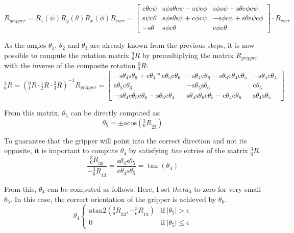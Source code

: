 \documentclass[twoside]{article}
\renewcommand{\c}{\text{c}}
\newcommand{\s}{\text{s}}
\newcommand{\R}[2]{\mbox{$_{#2}^{#1}{R}$}}
\newcommand{\acos}{\text{acos}}
\begin{document}
\begin{equation}
  R_{gripper} = R_z(\psi) R_y(\theta) R_x(\phi) R_{corr}
=
  \begin{bmatrix}
    \c\theta \c\psi& \s\phi \s\theta \c\psi - \s\psi \c\phi&  \s\phi \s\psi + \s\theta \c\phi \c\psi \\
    \s\psi \c\theta& \s\phi \s\theta \s\psi + \c\phi \c\psi& -\s\phi \c\psi + \s\theta \s\psi \c\phi \\
          -\s\theta&                        \s\phi \c\theta&                         \c\phi \c\theta
  \end{bmatrix}
  \cdot R_{corr}
\end{equation}

As the angles $\theta_1$, $\theta_2$ and $\theta_3$ are already known from the previous steps,
it is now possible to compute the rotation matrix $\R{3}{6}$ by premultiplying the matrix $R_{gripper}$
with the inverse of the composite rotation $\R{0}{3}$:
\begin{equation}
  \R{3}{6} = (\R{0}{1}\cdot \R{1}{2}\cdot \R{2}{3})^{-1} R_{gripper} =
  \begin{bmatrix}
    -\s\theta_4 \s\theta_6 + \c\theta_4*\c\theta_5 \c\theta_6 & -\s\theta_4 \c\theta_6 - \s\theta_6 \c\theta_4 \c\theta_5 & -\s\theta_5 \c\theta_4 \\
                                        \s\theta_5 \c\theta_6 &                                    -\s\theta_5 \s\theta_6 &             \c\theta_5 \\
    -\s\theta_4 \c\theta_5 \c\theta_6 - \s\theta_6 \c\theta_4 &  \s\theta_4 \s\theta_6 \c\theta_5 - \c\theta_4 \c\theta_6 &  \s\theta_4 \s\theta_5
  \end{bmatrix}
\end{equation}

From this matrix, $\theta_5$ can be directly computed as:
\begin{equation}
  \theta_5 = \pm\acos(\R{3}{6}_{23})
\end{equation}

To guarantee that the gripper will point into the correct direction and not its opposite,
it is important to compute $\theta_4$  by satisfying \emph{two} entries of the matrix
$\R{3}{6}$.
\begin{equation}
  \frac{\R{3}{6}_{33}}{-\R{3}{6}_{13}} = \frac{\s\theta_4\s\theta_5}{\c\theta_4\s\theta_5} = \tan(\theta_4)
\end{equation}

From this, $\theta_4$ can be computed as follows. Here, I set $theta_4$ to zero for very small
$\theta_5$. In this case, the correct orientation of the gripper is achieved by $\theta_6$.
\begin{equation}
  \theta_4
  \begin{cases}
    \text{atan2}\left(\R{3}{6}_{33}, -\R{3}{6}_{13}\right) & \text{if}\ |\theta_5| > \epsilon \\
    0                                           & \text{if}\ |\theta_5| \leq \epsilon
  \end{cases}
\end{equation}
\end{document}
